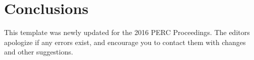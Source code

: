 \documentclass[english,aps,pra,reprint,noshowpacs,superscriptaddress]{revtex4-1}
\begin{document}


\section{Conclusions}
This template was newly updated for the 2016 PERC Proceedings.  The
editors apologize if any errors exist, and encourage you to contact
them with changes and other suggestions.  


\end{document}
